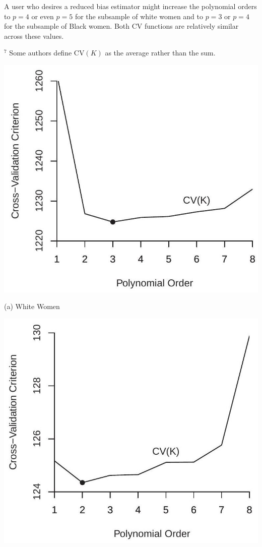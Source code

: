 \documentclass[10pt]{article}
\begin{document}
A user who desires a reduced bias estimator might increase the polynomial orders to $p=4$ or even $p=5$ for the subsample of white women and to $p=3$ or $p=4$ for the subsample of Black women. Both CV functions are relatively similar across these values.

${ }^{7}$ Some authors define $\mathrm{CV}(K)$ as the average rather than the sum.

\includegraphics[max width=\textwidth]{2022_10_23_2b38d6d54e7725c196e7g-20}

(a) White Women

\includegraphics[max width=\textwidth]{2022_10_23_2b38d6d54e7725c196e7g-20(1)}
\end{document}
